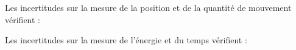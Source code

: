 \documentclass[a4paper]{article}
\begin{document}
\pagestyle{fancy}
\fancyhf{}
\setlength{\headheight}{15pt}

\begin{center}
	\large{}
\end{center}


Les incertitudes sur la mesure de la position et de la quantité de mouvement vérifient :
\begin{center}
\end{center}
Les incertitudes sur la mesure de l'énergie et du temps vérifient :
\begin{center}
\end{center}
\end{document}
